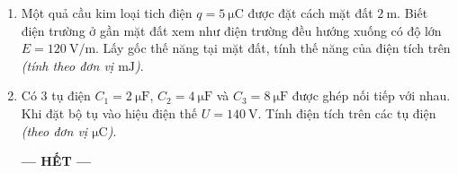 \begin{enumerate}[label=\bfseries Câu \arabic*:]
\item Một quả cầu kim loại tich điện $q=\SI{5}{\micro\coulomb}$ được đặt cách mặt đất $\SI{2}{\meter}$. Biết điện trường ở gần mặt đất xem như điện trường đều hướng xuống có độ lớn $E=\SI{120}{\volt/\meter}$. Lấy gốc thế năng tại mặt đất, tính thế năng của điện tích trên \textit{(tính theo đơn vị $\si{\milli\joule}$)}.

\item Có 3 tụ điện $C_1=\SI{2}{\micro\farad}$, $C_2=\SI{4}{\micro\farad}$ và $C_3=\SI{8}{\micro\farad}$ được ghép nối tiếp với nhau. Khi đặt bộ tụ vào hiệu điện thế $U=\SI{140}{\volt}$. Tính điện tích trên các tụ điện \textit{(theo đơn vị $\si{\micro\coulomb}$)}.
\begin{center}
	\textbf{--- HẾT ---}
\end{center}
\end{enumerate}